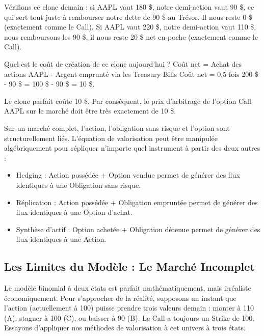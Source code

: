 \begin{examplebox}
Vérifions ce clone demain : si AAPL vaut 180 \$, notre demi-action vaut 90 \$, ce qui sert tout juste à rembourser notre dette de 90 \$ au Trésor. Il nous reste 0 \$ (exactement comme le Call). Si AAPL vaut 220 \$, notre demi-action vaut 110 \$, nous remboursons les 90 \$, il nous reste 20 \$ net en poche (exactement comme le Call).

Quel est le coût de création de ce clone aujourd'hui ?
Coût net = Achat des actions AAPL - Argent emprunté via les Treasury Bills
Coût net = 0,5 fois 200 \$ - 90 \$ = 100 \$ - 90 \$ = 10 \$.

Le clone parfait coûte 10 \$. Par conséquent, le prix d'arbitrage de l'option Call AAPL sur le marché doit être très exactement de 10 \$.
\end{examplebox}

\begin{theorembox}
Sur un marché complet, l'action, l'obligation sans risque et l'option sont structurellement liés. L'équation de valorisation peut être manipulée algébriquement pour répliquer n'importe quel instrument à partir des deux autres :
\begin{itemize}[label=$\rightarrow$]
    \item Hedging : Action possédée + Option vendue permet de générer des flux identiques à une Obligation sans risque.
    \item Réplication : Action possédée + Obligation empruntée permet de générer des flux identiques à une Option d'achat.
    \item Synthèse d'actif : Option achetée + Obligation détenue permet de générer des flux identiques à une Action.
\end{itemize}
\end{theorembox}

\subsection{Les Limites du Modèle : Le Marché Incomplet}

\begin{intuitionbox}
Le modèle binomial à deux états est parfait mathématiquement, mais irréaliste économiquement. Pour s'approcher de la réalité, supposons un instant que l'action (actuellement à 100) puisse prendre trois valeurs demain : monter à 110 (A), stagner à 100 (C), ou baisser à 90 (B). Le Call a toujours un Strike de 100.
Essayons d'appliquer nos méthodes de valorisation à cet univers à trois états.
\end{intuitionbox}

